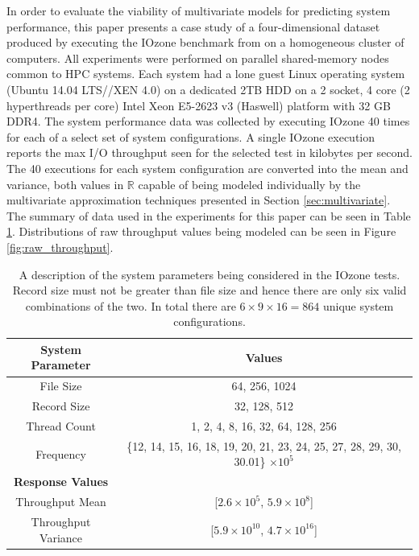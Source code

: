 \documentclass{scspaperproc}
\theoremstyle{scsthe}
\begin{document}
In order to evaluate the viability of multivariate models for
predicting system performance, this paper presents a case study of a
four-dimensional dataset produced by executing the IOzone benchmark
from  on a homogeneous cluster of computers. All
experiments were performed on parallel shared-memory nodes common to
HPC systems. Each system had a lone guest Linux operating system
(Ubuntu 14.04 LTS//XEN 4.0) on a dedicated 2TB HDD on a 2 socket, 4
core (2 hyperthreads per core) Intel Xeon E5-2623 v3 (Haswell)
platform with 32 GB DDR4. The system performance data was collected by
executing IOzone 40 times for each of a select set of system
configurations. A single IOzone execution reports the max I/O
throughput seen for the selected test in kilobytes per second. The 40
executions for each system configuration are converted into the mean
and variance, both values in $\mathbb{R}$ capable of being modeled
individually by the multivariate approximation techniques presented in
Section \ref{sec:multivariate}. The summary of data used in the
experiments for this paper can be seen in Table \ref{tab:data_type}.
Distributions of raw throughput values being modeled can be seen in
Figure \ref{fig:raw_throughput}.

\begin{table}
  \centering
  \begin{tabular}{c|c}
    \hline
    \textbf{System Parameter} & \textbf{Values}\\
    \hline
    File Size & 64, 256, 1024\\
    Record Size & 32, 128, 512\\
    Thread Count & 1, 2, 4, 8, 16, 32, 64, 128, 256\\
    Frequency & \{12, 14, 15, 16, 18, 19, 20, 21, 23, 24, 25, 27, 28, 29, 30, 30.01\} $\times 10^5$\\
    \hline
    \textbf{Response Values} & \\
    \hline
    Throughput Mean & [$2.6 \times 10^5$, $5.9 \times 10^8$]\\
    Throughput Variance & [$5.9\times 10^{10} $, $4.7 \times 10^{16}$]\\
    \hline
  \end{tabular}
  \caption{A description of the system parameters being considered in
    the IOzone tests. Record size must not be greater than file size
    and hence there are only six valid combinations of the two. In
    total there are $6 \times 9 \times 16 = 864$ unique system
    configurations.}
  \label{tab:data_type}
\end{table}
\end{document}
